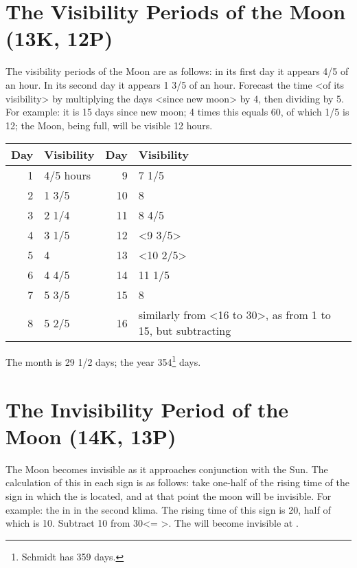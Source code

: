 \section{The Visibility Periods of the Moon (13K, 12P)}

The visibility periods of the Moon are as follows: in its first day it appears 4/5 of an hour. In its second day it appears 1 3/5 of an hour. Forecast the time <of its visibility> by multiplying the days <since new moon> by 4, then dividing by 5. For example: it is 15 days since new moon; 4 times this equals 60, of which 1/5 is 12; the Moon, being full, will be visible 12 hours.

\begin{table}[ht]
\begin{center}
\begin{tabularx}{\textwidth}	{| r | l | r | X |}
\hline
Day & Visibility & Day & Visibility \\
\hline
1	& 4/5 hours	& 9		& 7 1/5	\\
2	& 1 3/5	  	& 10	& 8			\\	
3	& 2 1/4		& 11	& 8 4/5	\\
4	& 3 1/5		& 12	& <9 3/5>	\\
5	& 4				& 13	& <10 2/5> \\
6	& 4 4/5		& 14	& 11 1/5	\\
7	& 5 3/5		& 15 	& 8			\\
8	& 5 2/5		& 16	& similarly from <16 to 30>, as
							  from 1 to 15, but subtracting \\				\hline
\end{tabularx}
\end{center}
\end{table}

The month is 29 1/2 days; the year 354\footnote{Schmidt has 359 days.} days.

\newpage
\section{The Invisibility Period of the Moon (14K, 13P)}

The Moon becomes invisible as it approaches conjunction with the Sun. The calculation of this in each sign is as follows: take one-half of the rising time of the sign in which the \Sun\xspace is located, and at that point the moon will be invisible. For example: the \Sun\xspace in \Aries\xspace in the second klima. The rising time of this sign is 20, half of which is 10. Subtract 10 from 30\deg\xspace <\Aries\xspace 1\deg\xspace = \Pisces\xspace 30\deg>. The \Moon\xspace will become invisible at \Pisces\xspace 20\deg.

